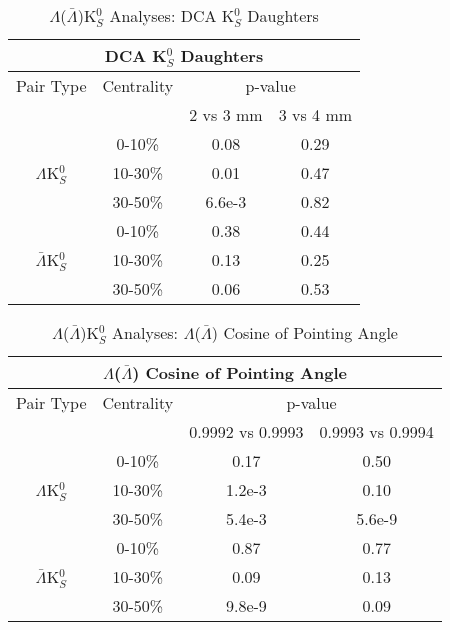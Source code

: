 \documentclass[../AnalysisNoteJBuxton.tex]{subfiles}
\begin{document}
\begin{table}
 \centering
 \begin{tabular}{|c|c|c|c|}
 \multicolumn{4}{c}{DCA K$^{0}_{S}$ Daughters} \\
  \hline
  Pair Type & Centrality & \multicolumn{2}{c|}{p-value} \\
  \cline{3-4}
   & & 2 vs 3 mm & 3 vs 4 mm \\
  \hline
   & 0-10\% & 0.08 & 0.29 \\
  $\Lambda$K$^{0}_{S}$ 
   & 10-30\% & 0.01 & 0.47 \\
   & 30-50\% & 6.6e-3 & 0.82 \\
  \hline
   & 0-10\% & 0.38 & 0.44 \\
  $\bar{\Lambda}$K$^{0}_{S}$ 
   & 10-30\% & 0.13 & 0.25 \\
   & 30-50\% & 0.06 & 0.53 \\
  \hline
 \end{tabular}
 \caption{$\Lambda$($\bar{\Lambda}$)K$^{0}_{S}$ Analyses: DCA K$^{0}_{S}$ Daughters}
 \label{tab:K0DaughtersDcaLamK0}
\end{table}

\begin{table}
 \centering
 \begin{tabular}{|c|c|c|c|}
 \multicolumn{4}{c}{$\Lambda$($\bar{\Lambda}$) Cosine of Pointing Angle} \\
  \hline
  Pair Type & Centrality & \multicolumn{2}{c|}{p-value} \\
  \cline{3-4}
   & & 0.9992 vs 0.9993 & 0.9993 vs 0.9994 \\
  \hline
   & 0-10\% & 0.17 & 0.50 \\
  $\Lambda$K$^{0}_{S}$ 
   & 10-30\% & 1.2e-3 & 0.10 \\
   & 30-50\% & 5.4e-3 & 5.6e-9 \\
  \hline
   & 0-10\% & 0.87 & 0.77 \\
  $\bar{\Lambda}$K$^{0}_{S}$ 
   & 10-30\% & 0.09 & 0.13 \\
   & 30-50\% & 9.8e-9 & 0.09 \\
  \hline
 \end{tabular}
 \caption{$\Lambda$($\bar{\Lambda}$)K$^{0}_{S}$ Analyses: $\Lambda$($\bar{\Lambda}$) Cosine of Pointing Angle}
 \label{tab:LamCosPointingAngleLamK0}
\end{table}
\end{document}
